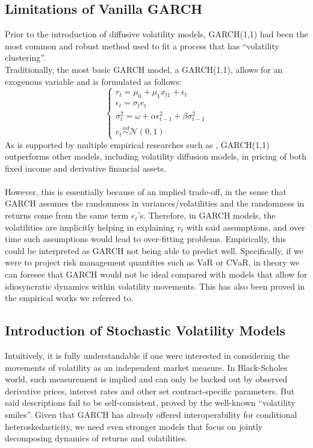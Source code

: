 \documentclass[letterpaper]{article}
\begin{document}
\subsection{Limitations of Vanilla GARCH}
Prior to the introduction of diffusive volatility models, GARCH(1,1) had been the most common and robust method used to fit a process that has ``volatility clustering''\cite{hansen2005garch}.\\
Traditionally, the most basic GARCH model, a GARCH(1,1), allows for an exogenous variable and is formulated as follows:
\begin{equation}
	\begin{cases}
		r_t=\mu_0+\mu_1x_{t1}+\epsilon_t\\
		\epsilon_t=\sigma_t e_t\\
		\sigma_t^2  = \omega +\alpha\epsilon_{t-1}^2 + \beta\sigma_{t-1}^2\\
		e_t\stackrel{iid}{\sim}\mathcal{N}(0,1) 
	\end{cases}
\end{equation}
As is supported by multiple empirical researches such as \cite{lehar2001svgarch}, GARCH(1,1) outperforms other models, including volatility diffusion models, in pricing of both fixed income and derivative financial assets.\\\\
However, this is essentially because of an implied trade-off, in the sense that GARCH assumes the randomness in variances/volatilities and the randomness in returns come from the same term $e_t$'s. Therefore, in GARCH models, the volatilities are implicitly helping in explaining $r_t$ with said assumptions, and over time such assumptions would lead to over-fitting problems. Empirically, this could be interpreted as GARCH not being able to predict well. Specifically, if we were to project risk management quantities such as VaR or CVaR, in theory we can foresee that GARCH would not be ideal compared with models that allow for idiosyncratic dynamics within volatility movements. This has also been proved in the empirical works we referred to.
\subsection{Introduction of Stochastic Volatility Models}
Intuitively, it is fully understandable if one were interested in considering the movements of volatility as an independent market measure. In Black-Scholes world, such measurement is implied and can only be backed out by observed derivative prices, interest rates and other set contract-specific parameters. But said descriptions fail to be self-consistent, proved by the well-known ``volatility smiles''. Given that GARCH has already offered interoperability for conditional heteroskedasticity, we need even stronger models that focus on jointly decomposing dynamics of returns and volatilities.
\end{document}
